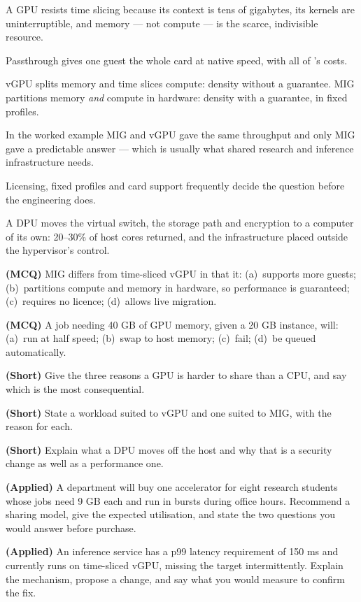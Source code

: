 \begin{chaptersummary}
\begin{tight}
  \item A GPU resists time slicing because its context is tens of gigabytes,
        its kernels are uninterruptible, and memory --- not compute --- is the
        scarce, indivisible resource.
  \item Passthrough gives one guest the whole card at native speed, with all of
        's costs.
  \item vGPU splits memory and time slices compute: density without a
        guarantee. MIG partitions memory \emph{and} compute in hardware:
        density with a guarantee, in fixed profiles.
  \item In the worked example MIG and vGPU gave the same throughput and only
        MIG gave a predictable answer --- which is usually what shared
        research and inference infrastructure needs.
  \item Licensing, fixed profiles and card support frequently decide the
        question before the engineering does.
  \item A DPU moves the virtual switch, the storage path and encryption to a
        computer of its own: 20--30\% of host cores returned, and the
        infrastructure placed outside the hypervisor's control.
\end{tight}
\end{chaptersummary}

\begin{reviewq}
  \item \textbf{(MCQ)} MIG differs from time-sliced vGPU in that it:
        (a)~supports more guests; (b)~partitions compute and memory in
        hardware, so performance is guaranteed; (c)~requires no licence;
        (d)~allows live migration.
  \item \textbf{(MCQ)} A job needing 40 GB of GPU memory, given a 20 GB
        instance, will: (a)~run at half speed; (b)~swap to host memory;
        (c)~fail; (d)~be queued automatically.
  \item \textbf{(Short)} Give the three reasons a GPU is harder to share than a
        CPU, and say which is the most consequential.
  \item \textbf{(Short)} State a workload suited to vGPU and one suited to MIG,
        with the reason for each.
  \item \textbf{(Short)} Explain what a DPU moves off the host and why that is
        a security change as well as a performance one.
  \item \textbf{(Applied)} A department will buy one accelerator for eight
        research students whose jobs need 9 GB each and run in bursts during
        office hours. Recommend a sharing model, give the expected utilisation,
        and state the two questions you would answer before purchase.
  \item \textbf{(Applied)} An inference service has a p99 latency requirement
        of 150 ms and currently runs on time-sliced vGPU, missing the target
        intermittently. Explain the mechanism, propose a change, and say what
        you would measure to confirm the fix.
\end{reviewq}
